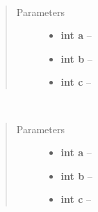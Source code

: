 \documentclass[letterpaper,10pt,english]{sphinxmanual}
\begin{document}
\begin{fulllineitems}
\label{gl:VertexData::addTriangle__i.i.i}~\begin{quote}\begin{description}
\item[{Parameters}] \leavevmode\begin{itemize}
\item {} 
\textbf{int a} -- 

\item {} 
\textbf{int b} -- 

\item {} 
\textbf{int c} -- 

\end{itemize}

\end{description}\end{quote}

\end{fulllineitems}


\begin{fulllineitems}
\label{gl:VertexData::addTriangleAndIndices__i.i.i}~\begin{quote}\begin{description}
\item[{Parameters}] \leavevmode\begin{itemize}
\item {} 
\textbf{int a} -- 

\item {} 
\textbf{int b} -- 

\item {} 
\textbf{int c} -- 

\end{itemize}

\end{description}\end{quote}

\end{fulllineitems}

\end{document}

